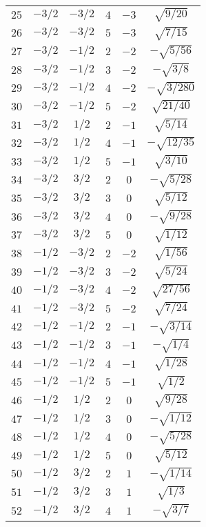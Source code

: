 \begin{table}
\begin{center}
\begin{tabular}{|c|c|c|c|c|c|}
$25$ & $-3/2$ & $-3/2$ & $4$ & $-3$ & $\sqrt{9/20}$ \\ 
$26$ & $-3/2$ & $-3/2$ & $5$ & $-3$ & $\sqrt{7/15}$ \\ 
$27$ & $-3/2$ & $-1/2$ & $2$ & $-2$ & $-\sqrt{5/56}$ \\ 
$28$ & $-3/2$ & $-1/2$ & $3$ & $-2$ & $-\sqrt{3/8}$ \\ 
$29$ & $-3/2$ & $-1/2$ & $4$ & $-2$ & $-\sqrt{3/280}$ \\ 
$30$ & $-3/2$ & $-1/2$ & $5$ & $-2$ & $\sqrt{21/40}$ \\ 
$31$ & $-3/2$ & $1/2$ & $2$ & $-1$ & $\sqrt{5/14}$ \\ 
$32$ & $-3/2$ & $1/2$ & $4$ & $-1$ & $-\sqrt{12/35}$ \\ 
$33$ & $-3/2$ & $1/2$ & $5$ & $-1$ & $\sqrt{3/10}$ \\ 
$34$ & $-3/2$ & $3/2$ & $2$ & $0$ & $-\sqrt{5/28}$ \\ 
$35$ & $-3/2$ & $3/2$ & $3$ & $0$ & $\sqrt{5/12}$ \\ 
$36$ & $-3/2$ & $3/2$ & $4$ & $0$ & $-\sqrt{9/28}$ \\ 
$37$ & $-3/2$ & $3/2$ & $5$ & $0$ & $\sqrt{1/12}$ \\ 
$38$ & $-1/2$ & $-3/2$ & $2$ & $-2$ & $\sqrt{1/56}$ \\ 
$39$ & $-1/2$ & $-3/2$ & $3$ & $-2$ & $\sqrt{5/24}$ \\ 
$40$ & $-1/2$ & $-3/2$ & $4$ & $-2$ & $\sqrt{27/56}$ \\ 
$41$ & $-1/2$ & $-3/2$ & $5$ & $-2$ & $\sqrt{7/24}$ \\ 
$42$ & $-1/2$ & $-1/2$ & $2$ & $-1$ & $-\sqrt{3/14}$ \\ 
$43$ & $-1/2$ & $-1/2$ & $3$ & $-1$ & $-\sqrt{1/4}$ \\ 
$44$ & $-1/2$ & $-1/2$ & $4$ & $-1$ & $\sqrt{1/28}$ \\ 
$45$ & $-1/2$ & $-1/2$ & $5$ & $-1$ & $\sqrt{1/2}$ \\ 
$46$ & $-1/2$ & $1/2$ & $2$ & $0$ & $\sqrt{9/28}$ \\ 
$47$ & $-1/2$ & $1/2$ & $3$ & $0$ & $-\sqrt{1/12}$ \\ 
$48$ & $-1/2$ & $1/2$ & $4$ & $0$ & $-\sqrt{5/28}$ \\ 
$49$ & $-1/2$ & $1/2$ & $5$ & $0$ & $\sqrt{5/12}$ \\ 
$50$ & $-1/2$ & $3/2$ & $2$ & $1$ & $-\sqrt{1/14}$ \\ 
$51$ & $-1/2$ & $3/2$ & $3$ & $1$ & $\sqrt{1/3}$ \\ 
$52$ & $-1/2$ & $3/2$ & $4$ & $1$ & $-\sqrt{3/7}$ \\ 

\end{tabular}
\end{center}
\end{table}
